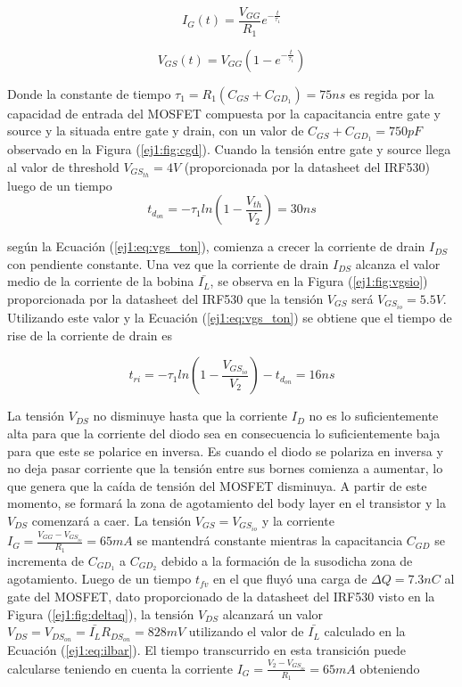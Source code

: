 \begin{equation}
I_G(t) = \frac{V_{GG}}{R_1}e^{-\frac{t}{\tau_1}}
\label{ej1:eq:ig_ton}
\end{equation}

\begin{equation}
V_{GS}(t) = V_{GG}(1-e^{-\frac{t}{\tau_1}})
\label{ej1:eq:vgs_ton}
\end{equation}

Donde la constante de tiempo $\tau_1 = R_1 (C_{GS}+C_{GD_{1}}) = 75ns$ es regida por la capacidad de entrada del MOSFET compuesta por la capacitancia entre gate y source y la situada entre gate y drain, con un valor de $C_{GS}+C_{GD_{1}} = 750pF$ observado en la Figura (\ref{ej1:fig:cgd}). Cuando la tensión entre gate y source llega al valor de threshold $V_{GS_{th}} = 4V$ (proporcionada por la datasheet del IRF530) luego de un tiempo 
\begin{equation}
t_{d_{on}} = -\tau_1 ln\left( 1-\frac{V_{th}}{V_2} \right) = 30ns
\label{ej1:eq:tdon}
\end{equation}

según la Ecuación (\ref{ej1:eq:vgs_ton}), comienza a crecer la corriente de drain $I_{DS}$ con pendiente constante. Una vez que la corriente de drain $I_{DS}$ alcanza el valor medio de la corriente de la bobina $\bar{I_L}$, se observa en la Figura (\ref{ej1:fig:vgsio}) proporcionada por la datasheet del IRF530 que la tensión $V_{GS}$ será $V_{GS_{io}} = 5.5V$. Utilizando este valor y la Ecuación (\ref{ej1:eq:vgs_ton}) se obtiene que el tiempo de rise de la corriente de drain es

\begin{equation}
	t_{ri} = -\tau_1 ln\left( 1-\frac{V_{GS_{io}}}{V_2} \right) -t_{d_{on}} = 16ns
\label{ej1:eq:trise}
\end{equation}

La tensión $V_{DS}$ no disminuye hasta que la corriente $I_D$ no es lo suficientemente alta para que la corriente del diodo sea en consecuencia lo suficientemente baja para que este se polarice en inversa. Es cuando el diodo se polariza en inversa y no deja pasar corriente que la tensión entre sus bornes comienza a aumentar, lo que genera que la caída de tensión del MOSFET disminuya. A partir de este momento, se formará la zona de agotamiento del body layer en el transistor y la $V_{DS}$ comenzará a caer. La tensión $V_{GS} = V_{GS_{io}}$ y la corriente $I_G = \frac{V_{GG}-V_{GS_{io}}}{R_1} = 65mA$ se mantendrá constante mientras la capacitancia $C_{GD}$ se incrementa de $C_{GD_1}$ a $C_{GD_2}$ debido a la formación de la susodicha zona de agotamiento. Luego de un tiempo $t_{fv}$ en el que fluyó una carga de $\Delta Q = 7.3nC$ al gate del MOSFET, dato proporcionado de la datasheet del IRF530 visto en la Figura (\ref{ej1:fig:deltaq}), la tensión $V_{DS}$ alcanzará un valor $V_{DS} = V_{DS_{on}} = \bar{I_L} R_{DS_{on}} = 828mV$ utilizando el valor de $\bar{I_L}$ calculado en la Ecuación (\ref{ej1:eq:ilbar}). El tiempo transcurrido en esta transición puede calcularse teniendo en cuenta la corriente $I_G = \frac{V_2 - V_{GS_{io}}}{R_1}= 65mA$ obteniendo

